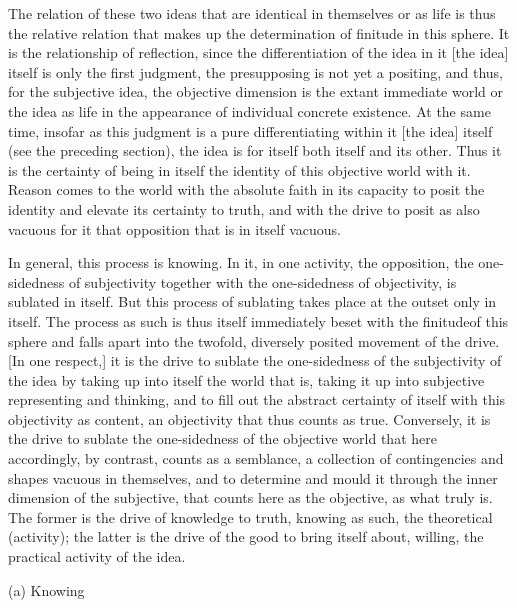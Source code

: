 The relation of these two ideas
that are identical in themselves
or as life is thus the relative relation
that makes up the determination of finitude in this sphere.
It is the relationship of reflection,
since the differentiation of the idea
in it [the idea] itself is only the first judgment,
the presupposing is not yet a positing,
and thus, for the subjective idea,
the objective dimension is the extant immediate world
or the idea as life in the appearance of individual concrete existence.
At the same time, insofar as this judgment is a pure differentiating
within it [the idea] itself (see the preceding section),
the idea is for itself both itself and its other.
Thus it is the certainty of being in itself
the identity of this objective world with it.
Reason comes to the world with the absolute faith
in its capacity to posit the identity
and elevate its certainty to truth,
and with the drive to posit as
also vacuous for it that opposition
that is in itself vacuous.

In general, this process is knowing.
In it, in one activity, the opposition,
the one-sidedness of subjectivity together with
the one-sidedness of objectivity,
is sublated in itself.
But this process of sublating takes place
at the outset only in itself.
The process as such is thus itself
immediately beset with the finitudeof this sphere
and falls apart into the twofold, diversely posited
movement of the drive.
[In one respect,] it is the drive to sublate
the one-sidedness of the subjectivity of the idea
by taking up into itself the world that is,
taking it up into subjective representing and thinking,
and to fill out the abstract certainty of itself
with this objectivity as content,
an objectivity that thus counts as true.
Conversely, it is the drive to sublate
the one-sidedness of the objective world
that here accordingly, by contrast, counts as a semblance,
a collection of contingencies and shapes vacuous in themselves,
and to determine and mould it through
the inner dimension of the subjective,
that counts here as the objective, as what truly is.
The former is the drive of knowledge to truth, knowing as such,
the theoretical (activity);
the latter is the drive of the good to bring itself about, willing,
the practical activity of the idea.

(a) Knowing

